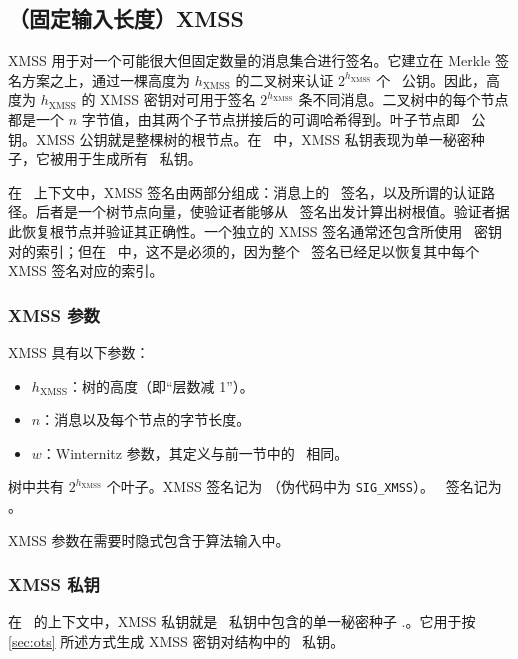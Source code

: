 \subsection{（固定输入长度）XMSS} \label{sec:xmss}

XMSS 用于对一个可能很大但固定数量的消息集合进行签名。它建立在 Merkle 签名方案之上，通过一棵高度为 $h_{\mathrm{XMSS}}$ 的二叉树来认证 $2^{h_{\mathrm{XMSS}}}$ 个 \WOTSCS\ 公钥。因此，高度为 $h_{\mathrm{XMSS}}$ 的 XMSS 密钥对可用于签名 $2^{h_{\mathrm{XMSS}}}$ 条不同消息。二叉树中的每个节点都是一个 $n$ 字节值，由其两个子节点拼接后的可调哈希得到。叶子节点即 \WOTSCS\ 公钥。XMSS 公钥就是整棵树的根节点。在 \SPHINCSA\ 中，XMSS 私钥表现为单一秘密种子，它被用于生成所有 \WOTSCS\ 私钥。

在 \SPHINCSA\ 上下文中，XMSS 签名由两部分组成：消息上的 \WOTSCS\ 签名，以及所谓的认证路径。后者是一个树节点向量，使验证者能够从 \WOTSCS\ 签名出发计算出树根值。验证者据此恢复根节点并验证其正确性。一个独立的 XMSS 签名通常还包含所使用 \WOTSCS\ 密钥对的索引；但在 \SPHINCSA\ 中，这不是必须的，因为整个 \SPHINCSA\ 签名已经足以恢复其中每个 XMSS 签名对应的索引。

\subsubsection{XMSS 参数}
\label{sec:xmsspara}
XMSS 具有以下参数：

\begin{itemize}
    \item $h_{\mathrm{XMSS}}$：树的高度（即“层数减 1”）。

    \item $n$：消息以及每个节点的字节长度。

    \item $w$：Winternitz 参数，其定义与前一节中的 \WOTSCS\ 相同。
\end{itemize}

树中共有 $2^{h_{\mathrm{XMSS}}}$ 个叶子。XMSS 签名记为 \sigxmss（伪代码中为 \texttt{SIG\_XMSS}）。 \WOTSCS\ 签名记为 \sig。

XMSS 参数在需要时隐式包含于算法输入中。

\subsubsection{XMSS 私钥}

在 \SPHINCSA\ 的上下文中，XMSS 私钥就是 \SPHINCSA\ 私钥中包含的单一秘密种子 \sk.\seed。它用于按 \cref{sec:ots} 所述方式生成 XMSS 密钥对结构中的 \WOTSCS\ 私钥。

